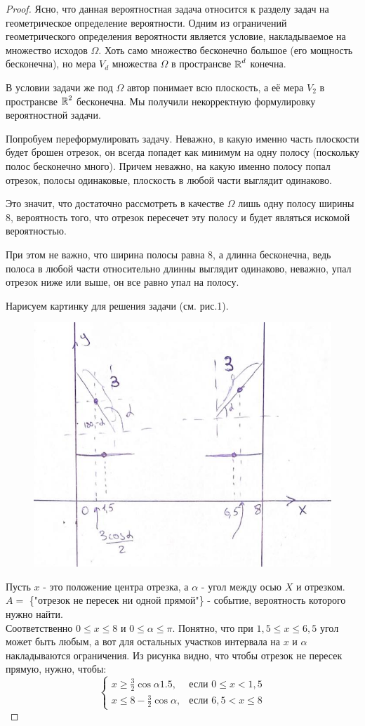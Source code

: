 \begin{proof}
Ясно, что данная вероятностная задача относится к разделу задач на геометрическое определение вероятности. 
Одним из ограничений геометрического определения вероятности является условие, накладываемое на множество исходов $ \Omega $. Хоть само множество бесконечно большое (его мощность бесконечна), но мера $ V_d $ множества $ \Omega $ в пространсве $ \operatorname{\mathbb{R}}^d$ конечна.

В условии задачи же под $ \Omega $ автор понимает всю плоскость, а её мера $ V_2 $ в пространсве $ \operatorname{\mathbb{R}}^2 $ бесконечна. Мы получили некорректную формулировку вероятностной задачи.

Попробуем переформулировать задачу.
Неважно, в какую именно часть плоскости будет брошен отрезок, он всегда попадет как минимум на одну полосу (поскольку полос бесконечно много). Причем неважно, на какую именно полосу попал отрезок, полосы одинаковые, плоскость в любой части выглядит одинаково. 

Это значит, что достаточно рассмотреть в качестве $ \Omega $ лишь одну полосу ширины 8, вероятность того, что отрезок пересечет эту полосу и будет являться искомой вероятностью.

При этом не важно, что ширина полосы равна 8, а длинна бесконечна, ведь полоса в любой части относительно длинны выглядит одинаково, неважно, упал отрезок ниже или выше, он все равно упал на полосу.

Нарисуем картинку для решения задачи (см. рис.1).
\begin{figure}
    \centering
    \includegraphics[width=0.5\linewidth]{1.jpg}
    \caption{}
    \label{fig:enter-label}
\end{figure}

Пусть $ x $ - это положение центра отрезка, а $ \alpha $ - угол между осью $ X $ и отрезком.\\
$ A =$ \{"отрезок не пересек ни одной прямой"\} - событие, вероятность которого нужно найти.\\
Соответственно $ 0\le x\le8 $ и $ 0\le\alpha\le\pi$.
Понятно, что при $ 1,5\le x\le6,5 $ угол может быть любым, а вот для остальных участков интервала на $ x $ и $ \alpha $ накладываются ограничения. Из рисунка видно, что чтобы отрезок не пересек прямую, нужно, чтобы:
\[
\begin{cases}
    x\ge\frac{3}{2}\cos{\alpha} 1.5, & \mbox{если } 0\le x < 1,5 \\
    x\le 8 - \frac{3}{2}\cos{\alpha}, & \mbox{если } 6,5 < x\le 8
\end{cases}
\]


\end{proof}
